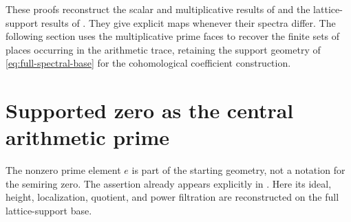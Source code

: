 \documentclass[11pt,a4paper]{article}
\theoremstyle{definition}\newtheorem{definition}[theorem]{Definition}
\begin{document}
These proofs reconstruct the scalar and multiplicative results of \cite{globalization,secondary} and the lattice-support results of \cite{support}. They give explicit maps whenever their spectra differ. The following section uses the multiplicative prime faces to recover the finite sets of places occurring in the arithmetic trace, retaining the support geometry of \eqref{eq:full-spectral-base} for the cohomological coefficient construction.

\section{Supported zero as the central arithmetic prime}
\label{sec:supported-prime}
The nonzero prime element $e$ is part of the starting geometry, not a notation for the semiring zero. The assertion already appears explicitly in \cite[\texttt{thm:zero-prime-not-irr}]{globalization}. Here its ideal, height, localization, quotient, and power filtration are reconstructed on the full lattice-support base.
\end{document}

